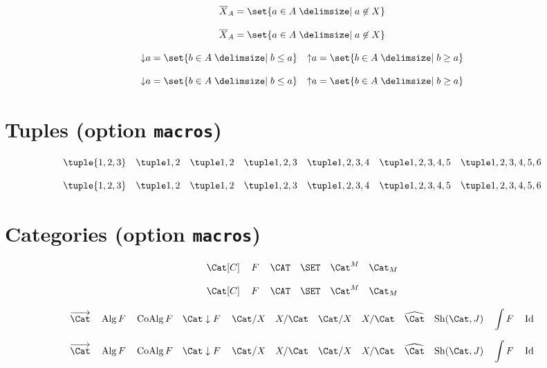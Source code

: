 \documentclass{article}
\begin{document}
\begin{verbatim*}
\[\compl{X}_{A}=\set{a\in A\given a\not\in X}\]
\end{verbatim*}
%
\[\compl{X}_{A} = \set{ a \in A \given a \not\in X }\]

\begin{verbatim*}
\[
\downset{a}=\set{b\in A\given b\leq a}\quad
\upset{a}=\set{b\in A\given b\geq a}
\]
\end{verbatim*}
%
\[
  \downset{a} = \set{ b \in A \given b \leq a } \quad
  \upset{a}   = \set{ b \in A \given b \geq a }
\]

\section{Tuples (option \texttt{macros})}

\begin{verbatim*}
\[
\tuple{1,2,3}\quad
\pair{1}{2}\quad
\couple{1}{2}\quad
\triple{1}{2}{3}\quad
\quadruple{1}{2}{3}{4}\quad
\quintuple{1}{2}{3}{4}{5}\quad
\sextuple{1}{2}{3}{4}{5}{6}
\]
\end{verbatim*}
%
\[
  \tuple{1,2,3} \quad
  \pair{1}{2} \quad
  \couple{1}{2} \quad
  \triple{1}{2}{3} \quad
  \quadruple{1}{2}{3}{4} \quad
  \quintuple{1}{2}{3}{4}{5} \quad
  \sextuple{1}{2}{3}{4}{5}{6}
\]

\section{Categories (option \texttt{macros})}

\begin{verbatim*}
\[
\Cat[C]\quad
\Fun[F]\quad
\CAT\quad
\SET\quad
\EM[\Cat][\Fun[M]]\quad
\Kl[\Cat][\Fun[M]]
\]
\end{verbatim*}
%
\[
  \Cat[C] \quad
  \Fun[F] \quad
  \CAT \quad
  \SET \quad
  \EM[\Cat][\Fun[M]] \quad
  \Kl[\Cat][\Fun[M]]
\]

\begin{verbatim*}
\[
\Arrow[\Cat]\quad
\Alg{\Fun}\quad
\CoAlg{\Fun}\quad
\Comma[\Cat][\Fun]\quad
\Slice[\Cat][X]\quad
\Coslice[\Cat][X]\quad
\Over[\Cat][X]\quad
\Under[\Cat][X]\quad
\Psh[\Cat]\quad
\Sh[\Cat][J]\quad
\Elts[\Fun]\quad
\Id
\]
\end{verbatim*}
%
\[
  \Arrow[\Cat] \quad
  \Alg{\Fun} \quad
  \CoAlg{\Fun} \quad
  \Comma[\Cat][\Fun] \quad
  \Slice[\Cat][X] \quad
  \Coslice[\Cat][X] \quad
  \Over[\Cat][X] \quad
  \Under[\Cat][X] \quad
  \Psh[\Cat] \quad
  \Sh[\Cat][J] \quad
  \Elts[\Fun] \quad
  \Id
\]
\end{document}
